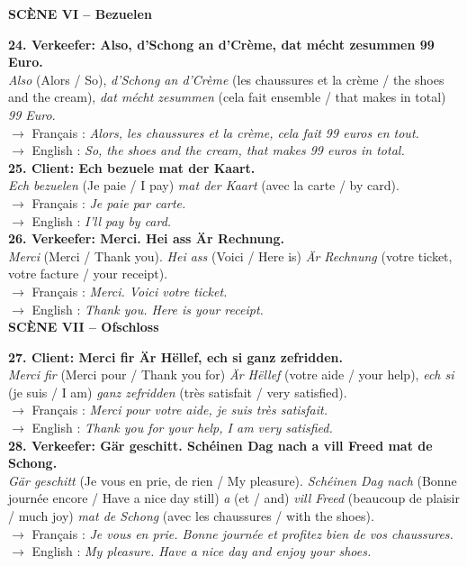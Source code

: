 \noindent\textbf{SCÈNE VI -- Bezuelen}

\noindent\textbf{24. Verkeefer: Also, d'Schong an d'Crème, dat mécht zesummen 99 Euro.}\\
\textit{Also} (Alors / So), \textit{d'Schong an d'Crème} (les chaussures et la crème / the shoes and the cream), \textit{dat mécht zesummen} (cela fait ensemble / that makes in total) \textit{99 Euro}.\\
$\rightarrow$ Français : \textit{Alors, les chaussures et la crème, cela fait 99 euros en tout.}\\
$\rightarrow$ English : \textit{So, the shoes and the cream, that makes 99 euros in total.}\\[0.5em]

\noindent\textbf{25. Client: Ech bezuele mat der Kaart.}\\
\textit{Ech bezuelen} (Je paie / I pay) \textit{mat der Kaart} (avec la carte / by card).\\
$\rightarrow$ Français : \textit{Je paie par carte.}\\
$\rightarrow$ English : \textit{I'll pay by card.}\\[0.5em]

\noindent\textbf{26. Verkeefer: Merci. Hei ass Är Rechnung.}\\
\textit{Merci} (Merci / Thank you). \textit{Hei ass} (Voici / Here is) \textit{Är Rechnung} (votre ticket, votre facture / your receipt).\\
$\rightarrow$ Français : \textit{Merci. Voici votre ticket.}\\
$\rightarrow$ English : \textit{Thank you. Here is your receipt.}\\[0.5em]

\noindent\textbf{SCÈNE VII -- Ofschloss}

\noindent\textbf{27. Client: Merci fir Är Hëllef, ech si ganz zefridden.}\\
\textit{Merci fir} (Merci pour / Thank you for) \textit{Är Hëllef} (votre aide / your help), \textit{ech si} (je suis / I am) \textit{ganz zefridden} (très satisfait / very satisfied).\\
$\rightarrow$ Français : \textit{Merci pour votre aide, je suis très satisfait.}\\
$\rightarrow$ English : \textit{Thank you for your help, I am very satisfied.}\\[0.5em]

\noindent\textbf{28. Verkeefer: Gär geschitt. Schéinen Dag nach a vill Freed mat de Schong.}\\
\textit{Gär geschitt} (Je vous en prie, de rien / My pleasure). \textit{Schéinen Dag nach} (Bonne journée encore / Have a nice day still) \textit{a} (et / and) \textit{vill Freed} (beaucoup de plaisir / much joy) \textit{mat de Schong} (avec les chaussures / with the shoes).\\
$\rightarrow$ Français : \textit{Je vous en prie. Bonne journée et profitez bien de vos chaussures.}\\
$\rightarrow$ English : \textit{My pleasure. Have a nice day and enjoy your shoes.}\\[0.5em]

